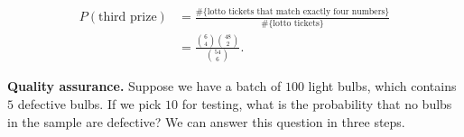 \documentclass[11pt]{exam}
\begin{document}
\begin{questions}
\begin{parts}
\begin{solution}
\begin{align*}
   P(\text{third prize})
    &= \frac{\#\{\text{lotto tickets that match exactly four numbers}\}}
         {\#\{\text{lotto tickets\}}} \\
     &= \frac{\binom{6}{4}\binom{48}{2}}{\binom{54}{6}}.
\end{align*}
\end{solution}


\end{parts}


\newpage

\question \textbf{Quality assurance.}  Suppose we have a batch of $100$ light bulbs,
which contains $5$ defective bulbs.  If we pick $10$ for testing, what is the
probability that no bulbs in the sample are defective?  We can answer this
question in three steps.

\end{questions}
\end{document}
